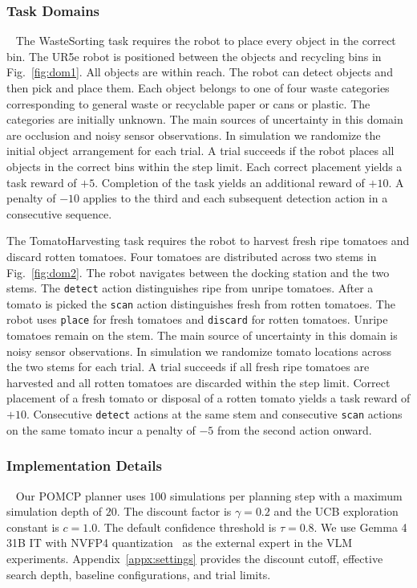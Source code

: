 \subsubsection{Task Domains}~\label{exp:setup_domains}
The WasteSorting task requires the robot to place every object in the correct bin. The UR5e robot is positioned between the objects and recycling bins in Fig.~\ref{fig:dom1}. All objects are within reach. The robot can detect objects and then pick and place them. Each object belongs to one of four waste categories corresponding to general waste or recyclable paper or cans or plastic. The categories are initially unknown. The main sources of uncertainty in this domain are occlusion and noisy sensor observations. In simulation we randomize the initial object arrangement for each trial. A trial succeeds if the robot places all objects in the correct bins within the step limit. Each correct placement yields a task reward of $+5$. Completion of the task yields an additional reward of $+10$. A penalty of $-10$ applies to the third and each subsequent detection action in a consecutive sequence.

The TomatoHarvesting task requires the robot to harvest fresh ripe tomatoes and discard rotten tomatoes. Four tomatoes are distributed across two stems in Fig.~\ref{fig:dom2}. The robot navigates between the docking station and the two stems. The \texttt{detect} action distinguishes ripe from unripe tomatoes. After a tomato is picked the \texttt{scan} action distinguishes fresh from rotten tomatoes. The robot uses \texttt{place} for fresh tomatoes and \texttt{discard} for rotten tomatoes. Unripe tomatoes remain on the stem. The main source of uncertainty in this domain is noisy sensor observations. In simulation we randomize tomato locations across the two stems for each trial. A trial succeeds if all fresh ripe tomatoes are harvested and all rotten tomatoes are discarded within the step limit. Correct placement of a fresh tomato or disposal of a rotten tomato yields a task reward of $+10$. Consecutive \texttt{detect} actions at the same stem and consecutive \texttt{scan} actions on the same tomato incur a penalty of $-5$ from the second action onward.


\subsubsection{Implementation Details}~\label{exp:details}
Our POMCP planner uses $100$ simulations per planning step with a maximum simulation depth of $20$. The discount factor is $\gamma=0.2$ and the UCB exploration constant is $c=1.0$. The default confidence threshold is $\tau=0.8$. We use Gemma 4 31B IT with NVFP4 quantization~\cite{gemmateam2026gemma4} as the external expert in the VLM experiments. Appendix~\ref{appx:settings} provides the discount cutoff, effective search depth, baseline configurations, and trial limits.

